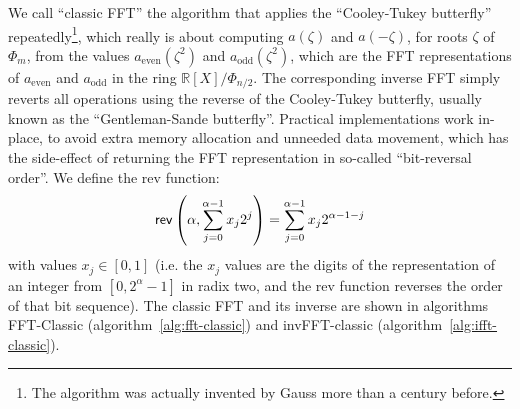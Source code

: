 \documentclass{llncs}
\newcommand{\bR}{\mathbb{R}}
\begin{document}
We call ``classic FFT'' the algorithm that applies the ``Cooley-Tukey
butterfly'' repeatedly\cite{CooTuk1965}\footnote{The algorithm was
actually invented by Gauss more than a century before\cite{Gau1866}.},
which really is about computing $a(\zeta)$ and $a(-\zeta)$, for roots
$\zeta$ of $\Phi_m$, from the values $a_{\text{even}}(\zeta^2)$ and
$a_{\text{odd}}(\zeta^2)$, which are the FFT representations of
$a_{\text{even}}$ and $a_{\text{odd}}$ in the ring $\bR[X]/\Phi_{n/2}$.
The corresponding inverse FFT simply reverts all operations using the
reverse of the Cooley-Tukey butterfly, usually known as the
``Gentleman-Sande butterfly''\cite{GenSan1966}. Practical
implementations work in-place, to avoid extra memory allocation and
unneeded data movement, which has the side-effect of returning the FFT
representation in so-called ``bit-reversal order''. We define the
\textsf{rev} function:
\begin{equation*}
    \text{\textsf{rev}}\left(\alpha, \sum_{j=0}^{\alpha-1} x_j 2^j\right) =
        \sum_{j=0}^{\alpha-1} x_j 2^{\alpha - 1 - j}
\end{equation*}
with values $x_j \in [0, 1]$ (i.e. the $x_j$ values are the digits of
the representation of an integer from $[0, 2^\alpha - 1]$ in radix two, and
the \textsf{rev} function reverses the order of that bit sequence). The
classic FFT and its inverse are shown in algorithms \textsf{FFT-Classic}
(algorithm~\ref{alg:fft-classic}) and \textsf{invFFT-classic}
(algorithm~\ref{alg:ifft-classic}).

\begin{algorithm}
    \caption{\ \ \textsf{FFT-classic}\label{alg:fft-classic}}
    \begin{algorithmic}[1]
        \Require{$a = \sum_{j=0}^{n-1} a[j] X^j \in \bR[X]/\Phi_n$,
            for $n = 2^\ell$}
                \EndFor
            \EndFor
        \EndFor
    \end{algorithmic}
\end{algorithm}
\end{document}
